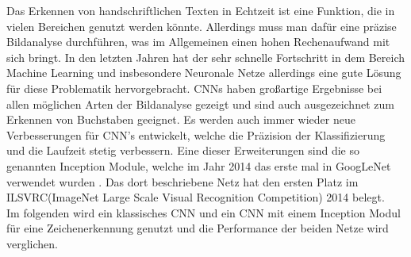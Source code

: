 \documentclass[runningheads,a4paper]{llncs}[2015/06/24]
\begin{document}
Das Erkennen von handschriftlichen Texten in Echtzeit ist eine Funktion, die in vielen Bereichen genutzt werden könnte. Allerdings muss man dafür eine präzise Bildanalyse durchführen, was im Allgemeinen einen hohen Rechenaufwand mit sich bringt. In den letzten Jahren hat der sehr schnelle Fortschritt in dem Bereich Machine Learning und insbesondere Neuronale Netze allerdings eine gute Lösung für diese Problematik hervorgebracht. CNNs haben großartige Ergebnisse bei allen möglichen Arten der Bildanalyse gezeigt und sind auch ausgezeichnet zum Erkennen von Buchstaben geeignet. Es werden auch immer wieder neue Verbesserungen für CNN's entwickelt, welche die Präzision der Klassifizierung und die Laufzeit stetig verbessern. Eine dieser Erweiterungen sind die so genannten Inception Module, welche im Jahr 2014 das erste mal in GoogLeNet verwendet wurden \cite{inception_paper}. Das dort beschriebene Netz hat den ersten Platz im ILSVRC(ImageNet Large Scale Visual Recognition Competition) 2014 belegt\cite{ILSVRC2014}.\\
Im folgenden wird ein klassisches CNN und ein CNN mit einem Inception Modul für eine Zeichenerkennung genutzt und die Performance der beiden Netze wird verglichen.\\
\end{document}
